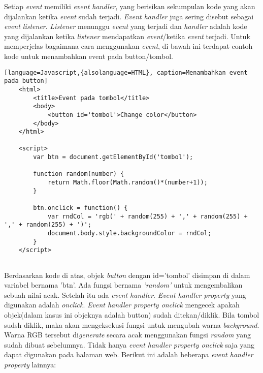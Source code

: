 Setiap \textit{event} memiliki \textit{event handler}, yang berisikan sekumpulan kode yang akan dijalankan ketika \textit{event} sudah terjadi. \textit{Event handler} juga sering disebut sebagai \textit{event listener}. \textit{Listener} menunggu \textit{event} yang terjadi dan \textit{handler} adalah kode yang dijalankan ketika \textit{listener} mendapatkan \textit{event}/ketika \textit{event} terjadi. Untuk memperjelas bagaimana cara menggunakan \textit{event}, di bawah ini terdapat contoh kode untuk menambahkan event pada button/tombol.

\begin{lstlisting}[language=Javascript,{alsolanguage=HTML}, caption=Menambahkan event pada button]
	<html>
		<title>Event pada tombol</title>
		<body>
			<button id='tombol'>Change color</button>
		</body>
	</html>
	
	<script>
		var btn = document.getElementById('tombol');

		function random(number) {
  			return Math.floor(Math.random()*(number+1));
		}

		btn.onclick = function() {
  			var rndCol = 'rgb(' + random(255) + ',' + random(255) + ',' + random(255) + ')';
  			document.body.style.backgroundColor = rndCol;
		}
	</script>
	
\end{lstlisting}

Berdasarkan kode di atas, objek \textit{button} dengan id='tombol' disimpan di dalam variabel bernama 'btn'. Ada fungsi bernama \textit{'random'} untuk mengembalikan sebuah nilai acak. Setelah itu ada \textit{event handler}. \textit{Event handler property} yang digunakan adalah \textit{onclick}. \textit{Event handler property onclick} mengecek apakah objek(dalam kasus ini objeknya adalah button) sudah ditekan/diklik. Bila tombol sudsh diklik, maka akan mengeksekusi fungsi untuk mengubah warna \textit{background}. Warna RGB tersebut di\textit{generate} secara acak menggunakan fungsi \textit{random} yang sudah dibuat sebelumnya. Tidak hanya \textit{event handler property onclick} saja yang dapat digunakan pada halaman web. Berikut ini adalah beberapa \textit{event handler property} lainnya:

